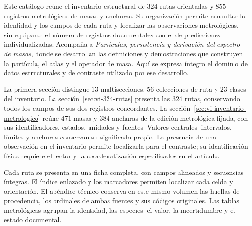 \documentclass[a4paper,10pt]{article}
\let\HMTIndiceOriginal\tableofcontents
\renewcommand{\tableofcontents}{\clearpage\begingroup\setlength{\parskip}{0pt}\fontsize{9.2}{10.5}\selectfont\HMTIndiceOriginal\endgroup\clearpage}
\begin{document}
\begin{minipage}{\textwidth}
Este catálogo reúne el inventario estructural de \(324\) rutas orientadas
y \(855\) registros metrológicos de masas y anchuras. Su organización
permite consultar la identidad y los campos de cada ruta y localizar las
observaciones metrológicas, sin equiparar el número de registros documentales con el
de predicciones individualizadas. Acompaña a \emph{Partículas,
persistencia y derivación del espectro de masas}, donde se desarrollan
las definiciones y demostraciones que construyen la partícula, el atlas
y el operador de masa. Aquí se expresa íntegro el dominio de datos
estructurales y de contraste utilizado por ese desarrollo.

La primera sección distingue \(13\) multisecciones, \(56\) colecciones de
ruta y \(23\) clases del inventario. La
sección~\ref{sec:vi-324-rutas} presenta las \(324\) rutas, conservando
todos los campos de sus dos registros concordantes. La
sección~\ref{sec:vi-inventario-metrologico} reúne \(471\) masas y
\(384\) anchuras de la edición metrológica fijada, con sus identificadores,
estados, unidades y fuentes. Valores centrales, intervalos, límites y
anchuras conservan su significado propio. La presencia de una
observación en el inventario permite localizarla para el contraste;
su identificación física requiere el lector y la coordenatización especificados
en el artículo.

Cada ruta se presenta en una ficha completa, con campos alineados y secuencias íntegras. El índice enlazado y los marcadores permiten localizar cada celda y orientación. El apéndice técnico conserva en este mismo volumen las huellas de procedencia, los ordinales de ambas fuentes y sus códigos originales. Las tablas metrológicas agrupan la identidad, las especies, el valor, la incertidumbre y el estado documental.\par
\end{minipage}
\par\endgroup
\clearpage
\tableofcontents
\clearpage



\end{document}
